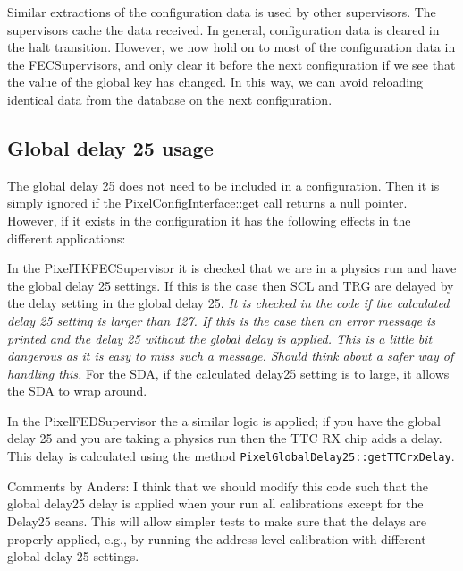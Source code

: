 Similar extractions of the configuration data is used by other
supervisors. The supervisors cache the data received. In general, configuration data
is cleared in the halt transition. However, we now hold on to most of the configuration data in the FECSupervisors, and only
clear it before the next configuration if we see that the value of the global key has changed. In this way, we can avoid reloading
identical data from the database on the next configuration.

\subsection{Global delay 25 usage}

The global delay 25 does not need to be included in a configuration. Then it
is simply ignored if the PixelConfigInterface::get call returns a 
null pointer. However, if it exists in the configuration it has the
following effects in the different applications:

In the PixelTKFECSupervisor it is checked that we are in a physics
run and have the global delay 25 settings. If this is the case then
SCL and TRG are delayed by the delay setting in the global delay 25.
{\it It is checked in the code if the calculated delay 25 setting is 
larger than 127. If this is the case then an error message is printed
and the delay 25 without the global delay is applied. This is a little
bit dangerous as it is easy to miss such a message. Should think about 
a safer way of handling this.}
For the SDA, if the calculated delay25 setting is to large, it allows
the SDA to wrap around. 

In the PixelFEDSupervisor the a similar logic is applied; if you
have the global delay 25 and you are taking a physics run then 
the TTC RX chip adds a delay. This delay is calculated using the 
method {\tt PixelGlobalDelay25::getTTCrxDelay}.

Comments by Anders: I think that we should modify this code such that
the global delay25 delay is applied when your run all calibrations
except for the Delay25 scans. This will allow simpler tests to make
sure that the delays are properly applied, e.g., by running the 
address level calibration with different global delay 25 settings.

\clearpage

